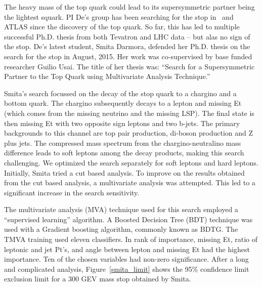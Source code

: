 \label{sec:kd_susy_smita}
The heavy mass of the top quark could lead to its supersymmetric partner being the lightest squark. PI De's group has been searching for the stop in \ and ATLAS since the discovery of the top quark. So far, this has led to multiple successful Ph.D. thesis from both Tevatron and LHC data -- but alas no sign of the stop. De's latest student, Smita Darmora, defended her Ph.D. thesis on the search for the stop in August, 2015. Her work was co-supervised by base funded researcher Guilio Usai. The title of her thesis was: ``Search for a Supersymmetric Partner to the Top Quark using Multivariate Analysis Technique.'' 

Smita's search focussed on the decay of the stop quark to a chargino and a bottom quark. The chargino subsequently decays to a lepton and missing Et (which comes from the missing neutrino and the missing LSP). The final state is then missing Et with two opposite sign leptons and two b-jets. The primary backgrounds to this channel are top pair production, di-boson production and Z plus jets. The compressed mass spectrum from the chargino-neutralino mass difference leads to soft leptons among the decay products, making this search challenging. We optimized the search separately for soft leptons and hard leptons. Initially, Smita tried a cut based analysis. To improve on the results obtained from the cut based analysis, a multivariate analysis was attempted. This led to a significant increase in the search sensitivity.

The multivariate analysis (MVA) technique used for this search employed a ``supervised learning'' algorithm. A Boosted Decision Tree (BDT) technique was used with a Gradient boosting algorithm, commonly known as BDTG. The TMVA training used eleven classifiers. In rank of importance, missing Et, ratio of leptonic and jet Pt's, and angle between lepton and missing Et had the highest importance. Ten of the chosen variables had non-zero significance. After a long and complicated analysis, 
Figure~\ref{smita_limit} shows the 95\% confidence limit exclusion limit for a 300 GEV mass stop obtained by Smita.


